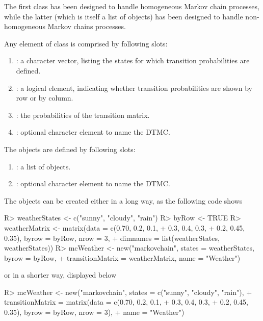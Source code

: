 \documentclass[nojss]{jss}
\begin{document}
The first class has been designed to handle homogeneous Markov chain processes,
while the latter (which is itself a list of  objects) has been
designed to handle non-homogeneous Markov chains processes.

Any element of  class is comprised by following slots:
\begin{enumerate}
  \item {}: a character vector, listing the states for which transition probabilities are defined.
  \item {}: a logical element, indicating whether transition probabilities are shown by row or by column.
  \item {}: the probabilities of the transition matrix.
  \item {}: optional character element to name the DTMC.
\end{enumerate}

The  objects are defined by following slots:
\begin{enumerate}
  \item {}: a list of  objects.
  \item {}: optional character element to name the DTMC.
\end{enumerate}

The  objects can be created either in a long way, as the following code shows

\begin{Schunk}
\begin{Sinput}
R> weatherStates <- c("sunny", "cloudy", "rain")
R> byRow <- TRUE
R> weatherMatrix <- matrix(data = c(0.70, 0.2, 0.1,
+                         0.3, 0.4, 0.3,
+                         0.2, 0.45, 0.35), byrow = byRow, nrow = 3,
+                       dimnames = list(weatherStates, weatherStates))
R> mcWeather <- new("markovchain", states = weatherStates, byrow = byRow, 
+                 transitionMatrix = weatherMatrix, name = "Weather")
\end{Sinput}
\end{Schunk}

or in a shorter way, displayed below

\begin{Schunk}
\begin{Sinput}
R> mcWeather <- new("markovchain", states = c("sunny", "cloudy", "rain"),
+                   transitionMatrix = matrix(data = c(0.70, 0.2, 0.1,
+                         0.3, 0.4, 0.3,
+                         0.2, 0.45, 0.35), byrow = byRow, nrow = 3), 
+                   name = "Weather")
\end{Sinput}
\end{Schunk}
\end{document}
